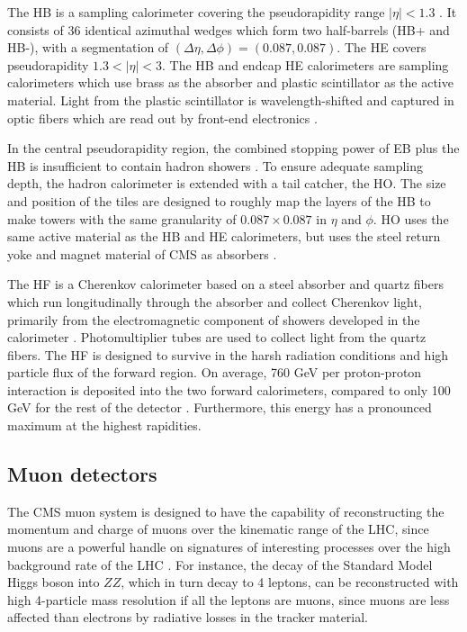 The HB is a sampling calorimeter covering the pseudorapidity range $|\eta| < 1.3$ \cite{CMS-2008-JINST-3-S08004}. It consists of 36 identical azimuthal wedges which form two half-barrels (HB+ and HB-), with a segmentation of $(\Delta \eta, \Delta \phi) = (0.087, 0.087)$. The HE covers pseudorapidity $1.3 < |\eta| < 3$. The HB and endcap HE calorimeters are sampling calorimeters which use brass as the absorber and plastic scintillator as the active material. Light from the plastic scintillator is wavelength-shifted and captured in optic fibers which are read out by front-end electronics \cite{CMS-TDR-010-2012}. 

In the central pseudorapidity region, the combined stopping power of EB plus the HB is insufficient to contain hadron showers \cite{CMS-2008-JINST-3-S08004}. To ensure adequate sampling depth, the hadron calorimeter is extended with a tail catcher, the HO. The size and position of the tiles are designed to roughly map the layers of the HB to make towers with the same granularity of $0.087 \times 0.087$ in $\eta$ and $\phi$. HO uses the same active material as the HB and HE calorimeters, but uses the steel return yoke and magnet material of CMS as absorbers \cite{CMS-TDR-010-2012}. 


The HF is a Cherenkov calorimeter based on a steel absorber and quartz fibers which run longitudinally through the absorber and collect Cherenkov light, primarily from the electromagnetic component of showers developed in the calorimeter \cite{CMS-TDR-010-2012}. Photomultiplier tubes are used to  collect light from the quartz fibers. The HF is designed to survive in the harsh radiation conditions and high particle flux of the forward region. On average, 760 GeV per proton-proton interaction is deposited into the two forward calorimeters, compared to only 100 GeV for the rest of the detector \cite{CMS-2008-JINST-3-S08004}. Furthermore, this energy has a pronounced maximum at the highest rapidities.

\subsection{Muon detectors}
The CMS muon system is designed to have the capability of reconstructing the momentum and charge of muons over the kinematic range of the LHC, since muons are a powerful handle on signatures of interesting processes over the high background rate of the LHC \cite{CMS-2008-JINST-3-S08004}. For instance, the decay of the Standard Model Higgs boson into $ZZ$, which in turn decay to 4 leptons, can be reconstructed with high 4-particle mass resolution if all the leptons are muons, since muons are less affected than electrons by radiative losses in the tracker material. 

